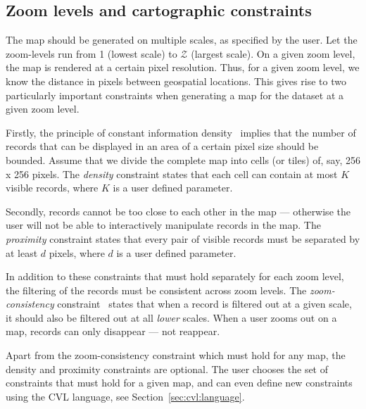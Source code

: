 \subsection{Zoom levels and cartographic constraints}
\label{sec:zoomlevels}



The map should be generated on multiple scales, as specified by the user. Let the zoom-levels run from 1 (lowest scale) to $\mathcal{Z}$ (largest scale). On a given zoom level, the map is rendered at a certain pixel resolution. Thus, for a given zoom level, we know the distance in pixels between geospatial locations. This gives rise to two particularly important constraints when generating a map for the dataset at a given zoom level.


Firstly, the principle of constant information density~\cite{topfer1966principles} implies that the number of records that can be displayed in an area of a certain pixel size should be bounded. Assume that we divide the complete map into cells (or tiles) of, say, 256 x 256 pixels. The \emph{density} constraint states that each cell can contain at most $K$ visible records, where $K$ is a user defined parameter.

Secondly, records cannot be too close to each other in the map --- otherwise the user will not be able to interactively manipulate records in the map. The \emph{proximity} constraint states that every pair of visible records must be separated by at least $d$ pixels, where $d$ is a user defined parameter.

In addition to these constraints that must hold separately for each zoom level, the filtering of the records must be consistent across zoom levels. The \emph{zoom-consistency} constraint~\cite{sarma2012fusiontables} states that when a record is filtered out at a given scale, it should also be filtered out at all \emph{lower} scales. When a user zooms out on a map, records can only disappear --- not reappear.

Apart from the zoom-consistency constraint which must hold for any map, the density and proximity constraints are optional. The user chooses the set of constraints that must hold for a given map, and can even define new constraints using the CVL language, see Section~\ref{sec:cvl:language}.

